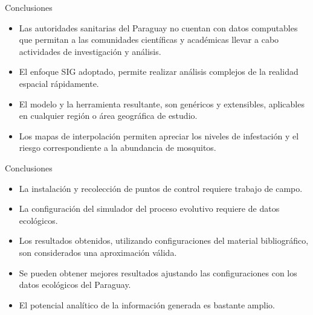 \begin{frame}[t]{Conclusiones}
    \begin{itemize}
        \item Las autoridades sanitarias del Paraguay no cuentan con datos computables que permitan a las comunidades científicas y académicas llevar a cabo actividades de investigación y análisis.

        \item El enfoque SIG adoptado, permite realizar análisis complejos de la realidad espacial rápidamente.


        \item El modelo y la herramienta resultante, son genéricos y extensibles, aplicables en cualquier región o área geográfica de estudio.

        \item Los mapas de interpolación permiten apreciar los niveles de infestación y el riesgo correspondiente a la abundancia de mosquitos.

    \end{itemize}
\end{frame}

\begin{frame}[t]{Conclusiones}
    \begin{itemize}

        \item La instalación y recolección de puntos de control requiere trabajo de campo.

        \item La configuración del simulador del proceso evolutivo requiere de datos ecológicos.

        \item Los resultados obtenidos, utilizando configuraciones del material bibliográfico, son considerados una aproximación válida.

        \item Se pueden obtener mejores resultados ajustando las configuraciones con los datos ecológicos del Paraguay.

        \item El potencial analítico de la información generada es bastante amplio.
    \end{itemize}
\end{frame}
